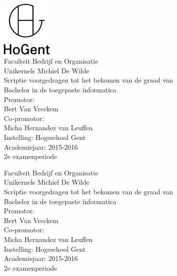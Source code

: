 \documentclass[pdftex,a4paper,12pt,twoside]{report}
\newcommand{\emptypage}{
\newpage
\thispagestyle{empty}
\mbox{}
\newpage
}
\newcommand{\student}{Michiel De Wilde}
\newcommand{\promotor}{Bert Van Vreckem}
\newcommand{\copromotor}{Micha Hernandez van Leuffen}
\newcommand{\instelling}{Hogeschool Gent}
\newcommand{\titel}{Unikernels}
\newcommand{\faculteit}{Faculteit Bedrijf en Organisatie}
\newcommand{\rapporttype}{Scriptie voorgedragen tot het bekomen van de graad van\\Bachelor in de toegepaste informatica}
\newcommand{\academiejaar}{2015-2016}
\newcommand{\examenperiode}{2e examenperiode}
\begin{document}

\begin{titlepage}
  \begin{center}

    \begingroup
    \rmfamily
    \includegraphics[width=2.5cm]{img/HG-beeldmerk-woordmerk}\\[.5cm]
    \faculteit\\[3cm]
    \titel
    \vfill
    \student\\[3.5cm]
    \rapporttype\\[2cm]
    Promotor:\\
    \promotor\\
    Co-promotor:\\
    \copromotor\\[2.5cm]
    Instelling: \instelling\\[.5cm]
    Academiejaar: \academiejaar\\[.5cm]
    \examenperiode
    \endgroup

  \end{center}
  \restoregeometry
\end{titlepage}


\emptypage


\begin{titlepage}
  \begin{center}

    \begingroup
    \rmfamily
    \faculteit\\[3cm]
    \titel
    \vfill
    \student\\[3.5cm]
    \rapporttype\\[2cm]
    Promotor:\\
    \promotor\\
    Co-promotor:\\
    \copromotor\\[2.5cm]
    Instelling: \instelling\\[.5cm]
    Academiejaar: \academiejaar\\[.5cm]
    \examenperiode
    \endgroup

  \end{center}
  \restoregeometry
\end{titlepage}
\end{document}

